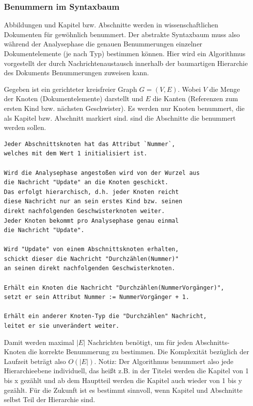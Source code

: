  
\subsubsection{Benummern im Syntaxbaum}\label{}

 
Abbildungen und Kapitel bzw. Abschnitte werden in wissenschaftlichen Dokumenten für gewöhnlich benummert. Der abstrakte Syntaxbaum muss also während der Analysephase die genauen Benummerungen einzelner Dokumentelemente (je nach Typ) bestimmen können. Hier wird ein Algorithmus vorgestellt der durch Nachrichtenaustausch innerhalb der baumartigen Hierarchie des Dokuments Benummerungen zuweisen kann.

 
Gegeben ist ein gerichteter kreisfreier Graph \(G = (V, E)\). Wobei \(V\) die Menge der Knoten (Dokumentelemente) darstellt und \(E\) die Kanten (Referenzen zum ersten Kind bzw. nächsten Geschwister). Es werden nur Knoten benummert, die als Kapitel bzw. Abschnitt markiert sind. sind die Abschnitte die benummert werden sollen.

 
\begin{verbatim}
Jeder Abschnittsknoten hat das Attribut `Nummer`,
welches mit dem Wert 1 initialisiert ist.

Wird die Analysephase angestoßen wird von der Wurzel aus
die Nachricht "Update" an die Knoten geschickt.
Das erfolgt hierarchisch, d.h. jeder Knoten reicht
diese Nachricht nur an sein erstes Kind bzw. seinen
direkt nachfolgenden Geschwisterknoten weiter.
Jeder Knoten bekommt pro Analysephase genau einmal
die Nachricht "Update".

Wird "Update" von einem Abschnittsknoten erhalten,
schickt dieser die Nachricht "Durchzählen(Nummer)"
an seinen direkt nachfolgenden Geschwisterknoten.

Erhält ein Knoten die Nachricht "Durchzählen(NummerVorgänger)",
setzt er sein Attribut Nummer := NummerVorgänger + 1.

Erhält ein anderer Knoten-Typ die "Durchzählen" Nachricht,
leitet er sie unverändert weiter.
\end{verbatim}
 
Damit werden maximal \(|E|\) Nachrichten benötigt, um für jeden Abschnitts-Knoten die korrekte Benummerung zu bestimmen. Die Komplexität bezüglich der Laufzeit beträgt also \(O(|E|)\). Notiz: Der Algorithmus benummert also jede Hierarchieebene individuell, das heißt z.B. in der Titelei werden die Kapitel von 1 bis x gezählt und ab dem Hauptteil werden die Kapitel auch wieder von 1 bis y gezählt. Für die Zukunft ist es bestimmt sinnvoll, wenn Kapitel und Abschnitte selbst Teil der Hierarchie sind.


